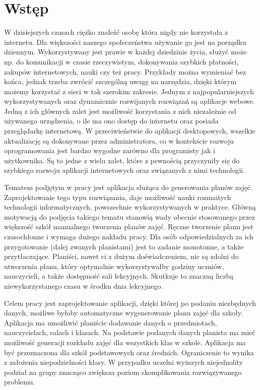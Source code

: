 
\chapter{Wstęp}
W dzisiejszych czasach ciężko znaleźć osobę która nigdy nie korzystała z internetu. Dla większości naszego społeczeństwa używanie go jest na porządku dziennym. Wykorzystywany jest prawie w każdej dziedzinie życia, służyć może np. do komunikacji w czasie rzeczywistym, dokonywania szybkich płatności, zakupów internetowych, nauki czy też pracy. Przykłady można wymieniać bez końca, jednak trzeba zwrócić szczególną uwagę na narzędzia, dzięki którym możemy korzystać z sieci w tak szerokim zakresie. Jednym z najpopularniejszych wykorzystywanych oraz dynamicznie rozwijanych rozwiązań są aplikacje webowe. Jedną z ich głównych zalet jest możliwość korzystania z nich niezależnie od używanego urządzenia, o ile ma ono dostęp do internetu oraz posiada przeglądarkę internetową. W przeciwieństwie do aplikacji desktopowych, wszelkie aktualizację są dokonywane przez administratora, co w kontekście rozwoju oprogramowania jest bardzo wygodne zarówno dla programisty jak i użytkownika. Są to jedne z wielu zalet, które z pewnością przyczyniły się do szybkiego rozwoju aplikacji internetowych oraz związanych z nimi technologii.

Tematem podjętym w pracy jest aplikacja służąca do generowania planów zajęć. Zaprojektowanie tego typu rozwiązania, daje możliwość nauki rozmaitych technologii informatycznych, powszechnie wykorzystywanych w praktyce. Główną motywacją do podjęcia takiego tematu stanowią wady obecnie stosowanego przez większość szkół manualnego tworzenia planów zajęć. Ręczne tworzenie planu jest czasochłonne i wymaga dużego nakładu pracy. Dla osób odpowiedzialnych za ich przygotowanie (dalej zwanych planistami) jest to zadanie monotonne, a także przytłaczające. Planiści, nawet ci z dużym doświadczeniem, nie są zdolni do utworzenia planu, który optymalnie wykorzystywałby godziny uczniów, nauczycieli, a także dostępność sali lekcyjnych. Skutkuje to znaczną liczbą niewykorzystanego czasu w środku dnia lekcyjnego.

Celem pracy jest zaprojektowanie aplikacji, dzięki której po podaniu niezbędnych danych, możliwe byłoby automatyczne wygenerowanie planu zajęć dla szkoły. Aplikacja ma umożliwić planiście dodawanie danych o przedmiotach, nauczycielach, salach i klasach. Na podstawie podanych danych planista ma mieć możliwość generacji rozkładu zajęć dla wszystkich klas w szkole. Aplikacja ma być przeznaczona dla szkół podstawowych oraz średnich. Ograniczenie to wynika z założenia niepodzielności klasy. W przypadku uczelni wyższych niejednolity podział na grupy znacząco zwiększa poziom skomplikowania rozwiązywanego problemu. 

